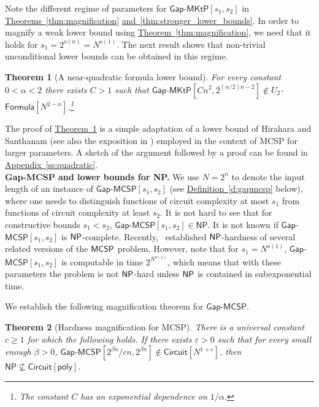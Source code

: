 \documentclass[11pt]{article}
\numberwithin{equation}{section}
\newtheorem{theorem}{Theorem}[section]
\theoremstyle{definition}
\theoremstyle{plain}
\newcommand{\expref}[2]{\hyperref[#2]{#1~\ref{#2}}}
\newcommand{\NP}{\ensuremath{{\sf NP}}\xspace}
\newcommand{\MCSP}{\ensuremath{{\sf MCSP}}\xspace}
\newcommand{\gapmktp}{\mathsf{Gap}$-$\mathsf{MKtP}}
\newcommand{\gapmcsp}{\mathsf{Gap}$-$\mathsf{MCSP}}
\begin{document}
Note the different regime of parameters for $\gapmktp[s_1,s_2]$ in \expref{Theorems}{thm:magnification} \expref{and}{thm:stronger_lower_bounds}. In order to magnify a weak lower bound using \expref{Theorem}{thm:magnification}, we need that it holds for $s_1 = 2^{o(n)} = N^{o(1)}$. The next result shows that non-trivial unconditional lower bounds can be obtained in this regime.


\begin{theorem}[A near-quadratic formula lower bound]\label{thm:lower_bound} For every constant $0 < \alpha < 2$ there exists $C > 1$ such that $\gapmktp[Cn^2, 2^{(\alpha/2)n - 2}] \notin U_2$-$\mathsf{Formula}[N^{2 - \alpha}]$.\footnote{The constant $C$ has an exponential dependence on $1/\alpha$.}
\end{theorem}


The proof of \expref{Theorem}{thm:lower_bound} is a simple adaptation of a lower bound of Hirahara and Santhanam \cite[Section 4]{DBLP:conf/coco/HiraharaS17} (see also the exposition in \cite[Appendix C.1]{OS18}) employed in the context of MCSP for larger parameters. A sketch of the argument followed by a proof can be found in \expref{Appendix}{ss:quadratic}.\\

\noindent \textbf{Gap-MCSP and lower bounds for NP.} We use $N = 2^n$ to denote the input length of an instance of $\gapmcsp[s_1,s_2]$ (see \expref{Definition}{d:gapmcsp} below), where one needs to distinguish functions of circuit complexity at most $s_1$ from functions of circuit complexity at least $s_2$. It is not hard to see that for constructive bounds $s_1 < s_2$, $\gapmcsp[s_1,s_2] \in \mathsf{NP}$. It is not known if $\gapmcsp[s_1,s_2]$ is \NP-complete. Recently,~\cite{DBLP:conf/coco/IlangoLO20} established \NP-hardness of several related versions of the \MCSP problem. However, note that for $s_1=N^{o(1)}$, $\gapmcsp[s_1,s_2]$ is computable in time $2^{N^{o(1)}}$, which means that with these parameters the problem is not \NP-hard unless \NP is contained in subexponential time.

We establish the following magnification theorem for $\gapmcsp$.


\begin{theorem}[Hardness magnification for MCSP]\label{thm:magnification_mcsp}
There is a universal constant $c \geq 1$ for which the following holds. If there exists $\varepsilon > 0$ such that for every small enough $\beta > 0$, $\gapmcsp[2^{\beta n}/cn, 2^{\beta n}] \notin \mathsf{Circuit}[N^{1 + \varepsilon}]$, then $\mathsf{NP} \nsubseteq \mathsf{Circuit}[\mathsf{poly}]$.
\end{theorem}
\end{document}
